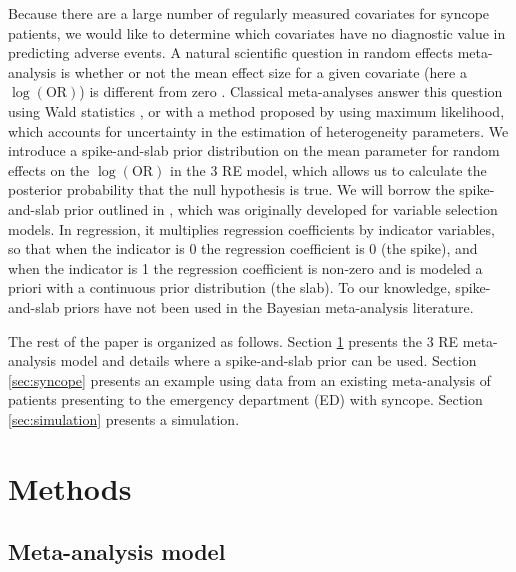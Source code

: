 \documentclass[AMA,STIX1COL]{WileyNJD-v2}
\begin{document}
Because there are a large number of regularly measured covariates for syncope patients, we would like to determine which covariates have no diagnostic value in predicting adverse events. A natural scientific question in random effects meta-analysis is whether or not the mean effect size for a given covariate (here a $\log(\mbox{OR})$) is different from zero \citep{higgins2009}. Classical meta-analyses answer this question using Wald statistics \citep{higgins2009, follmann1999}, or with a method proposed by \citet{hardy1996} using maximum likelihood, which accounts for uncertainty in the estimation of heterogeneity parameters. We introduce a spike-and-slab prior distribution \citep{GM1993, GM1997, KM1998, ishwaran2005} on the mean parameter for random effects on the $\log(\mbox{OR})$ in the 3 RE model, which allows us to calculate the posterior probability that the null hypothesis is true. We will borrow the spike-and-slab prior outlined in \citet{KM1998}, which was originally developed for variable selection models. In regression, it multiplies regression coefficients by indicator variables, so that when the indicator is 0 the regression coefficient is 0 (the spike), and when the indicator is 1 the regression coefficient is non-zero and is modeled a priori with a continuous prior distribution (the slab). To our knowledge, spike-and-slab priors have not been used in the Bayesian meta-analysis literature. 

The rest of the paper is organized as follows. Section \ref{sec:methods} presents the 3 RE meta-analysis model and details where a spike-and-slab prior can be used. Section \ref{sec:syncope} presents an example using data from an existing meta-analysis \citep{gibson2018} of patients presenting to the emergency department (ED) with syncope. Section \ref{sec:simulation} presents a simulation.

\section{Methods} \label{sec:methods}


\subsection{Meta-analysis model} \label{sec:RCT_meta}
\end{document}
